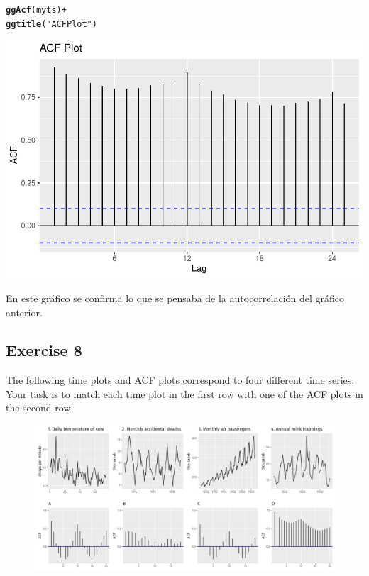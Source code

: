 \documentclass[12pt]{article}\usepackage[]{graphicx}\usepackage[]{xcolor}
\makeatletter
\def\maxwidth{ %
  \ifdim\Gin@nat@width>\linewidth
    \linewidth
  \else
    \Gin@nat@width
  \fi
}
\newcommand{\hlsng}[1]{\textcolor[rgb]{0.192,0.494,0.8}{#1}}%
\newcommand{\hlopt}[1]{\textcolor[rgb]{0,0,0}{#1}}%
\newcommand{\hldef}[1]{\textcolor[rgb]{0.345,0.345,0.345}{#1}}%
\newcommand{\hlkwd}[1]{\textcolor[rgb]{0.737,0.353,0.396}{\textbf{#1}}}%
\newenvironment{kframe}{%
 \def\at@end@of@kframe{}%
 \ifinner\ifhmode%
  \def\at@end@of@kframe{\end{minipage}}%
  \begin{minipage}{\columnwidth}%
 \fi\fi%
 \def\FrameCommand##1{\hskip\@totalleftmargin \hskip-\fboxsep
 \colorbox{shadecolor}{##1}\hskip-\fboxsep
     \hskip-\linewidth \hskip-\@totalleftmargin \hskip\columnwidth}%
 \MakeFramed {\advance\hsize-\width
   \@totalleftmargin\z@ \linewidth\hsize
   \@setminipage}}%
 {\par\unskip\endMakeFramed%
 \at@end@of@kframe}
\newenvironment{knitrout}{}{} %
\makeatother
\begin{document}
\begin{knitrout}
\color{fgcolor}\begin{kframe}
\begin{alltt}
\hlkwd{ggAcf}\hldef{(myts)} \hlopt{+}
  \hlkwd{ggtitle}\hldef{(}\hlsng{"ACF Plot"}\hldef{)}
\end{alltt}
\end{kframe}

{\centering \includegraphics[width=\maxwidth]{figure/unnamed-chunk-6-1} 

}


\end{knitrout}


En este gráfico se confirma lo que se pensaba de la autocorrelación del gráfico anterior.

\subsection{Exercise 8}

The following time plots and ACF plots correspond to four different time series. Your task is to match each time plot in the first row with one of the ACF plots in the second row.

\begin{figure}[ht]
  \centering
  \includegraphics[width=\textwidth]{img/Punto8.png}
\end{figure}
\end{document}
